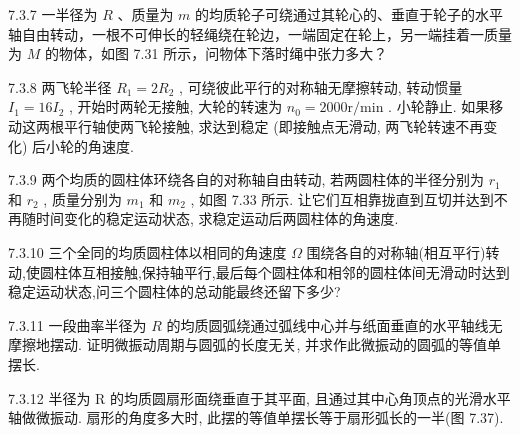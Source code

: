 \begin{problem}{7.3.7}
一半径为 $R$ 、质量为 $m$ 的均质轮子可绕通过其轮心的、垂直于轮子的水平轴自由转动，一根不可伸长的轻绳绕在轮边，一端固定在轮上，另一端挂着一质量为 $M$ 的物体，如图 7.31 所示，问物体下落时绳中张力多大？
\begin{center}

\end{center}
\end{problem}
\clearpage


\begin{problem}{7.3.8}
两飞轮半径 $R_{1} = 2R_{2}$ , 可绕彼此平行的对称轴无摩擦转动, 转动惯量 $I_{1} = 16I_{2}$ , 开始时两轮无接触, 大轮的转速为 $n_{0} = 2000 \mathrm{r} / \mathrm{min}$ . 小轮静止. 如果移动这两根平行轴使两飞轮接触, 求达到稳定 (即接触点无滑动, 两飞轮转速不再变化) 后小轮的角速度.
\end{problem}
\clearpage


\begin{problem}{7.3.9}
两个均质的圆柱体环绕各自的对称轴自由转动, 若两圆柱体的半径分别为 $r_1$ 和 $r_2$ , 质量分别为 $m_1$ 和 $m_2$ , 如图 7.33 所示. 让它们互相靠拢直到互切并达到不再随时间变化的稳定运动状态, 求稳定运动后两圆柱体的角速度.
\begin{center}

\end{center}
\end{problem}
\clearpage


\begin{problem}{7.3.10}
三个全同的均质圆柱体以相同的角速度 $\Omega$ 围绕各自的对称轴(相互平行)转动,使圆柱体互相接触,保持轴平行,最后每个圆柱体和相邻的圆柱体间无滑动时达到稳定运动状态,问三个圆柱体的总动能最终还留下多少?
\end{problem}
\clearpage


\begin{problem}{7.3.11}
一段曲率半径为 $R$ 的均质圆弧绕通过弧线中心并与纸面垂直的水平轴线无摩擦地摆动. 证明微振动周期与圆弧的长度无关, 并求作此微振动的圆弧的等值单摆长.
\end{problem}
\clearpage


\begin{problem}{7.3.12}
半径为 R 的均质圆扇形面绕垂直于其平面, 且通过其中心角顶点的光滑水平轴做微振动. 扇形的角度多大时, 此摆的等值单摆长等于扇形弧长的一半(图 7.37).
\begin{center}

\end{center}
\end{problem}
\clearpage


